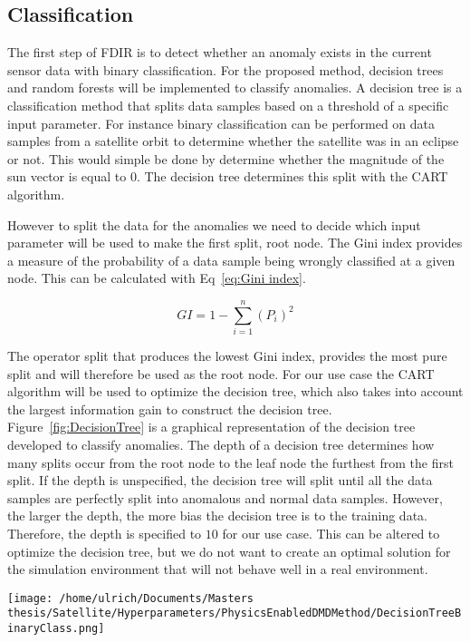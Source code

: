 \documentclass[letterpaper, 10 pt, conference]{ieeeconf}  %
\begin{document}
\subsection{Classification}
The first step of FDIR is to detect whether an anomaly exists in the current sensor data with binary classification. For the proposed method, decision trees and random forests will be implemented to classify anomalies. A decision tree is a classification method that splits data samples based on a threshold of a specific input parameter. For instance binary classification can be performed on data samples from a satellite orbit to determine whether the satellite was in an eclipse or not. This would simple be done by determine whether the magnitude of the sun vector is equal to $0$. The decision tree determines this split with the CART algorithm.

However to split the data for the anomalies we need to decide which input parameter will be used to make the first split, root node. The Gini index provides a measure of the probability of a data sample being wrongly classified at a given node. This can be calculated with Eq~\ref{eq:Gini index}.

\begin{equation}
GI = 1 - \sum_{i = 1}^{n}{(P_i)^2}
\label{eq:Gini index}
\end{equation}

The operator split that produces the lowest Gini index, provides the most pure split and will therefore be used as the root node. For our use case the CART algorithm will be used to optimize the decision tree, which also takes into account the largest information gain to construct the decision tree. Figure~\ref{fig:DecisionTree} is a graphical representation of the decision tree developed to classify anomalies. The depth of a decision tree determines how many splits occur from the root node to the leaf node the furthest from the first split. If the depth is unspecified, the decision tree will split until all the data samples are perfectly split into anomalous and normal data samples. However, the larger the depth, the more bias the decision tree is to the training data. Therefore, the depth is specified to $10$ for our use case. This can be altered to optimize the decision tree, but we do not want to create an optimal solution for the simulation environment that will not behave well in a real environment.

\begin{figure*}[!htb]
	\centering
	\texttt{[image: /home/ulrich/Documents/Masters thesis/Satellite/Hyperparameters/PhysicsEnabledDMDMethod/DecisionTreeBinaryClass.png]}
	\caption{Decision Tree}
	\label{fig:DecisionTree}
\end{figure*}
\end{document}
